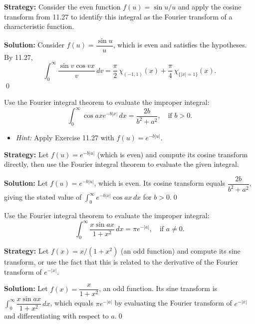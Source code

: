 \noindent\textbf{Strategy:} Consider the even function $f(u)=\sin u/u$ and apply the cosine transform from 11.27 to identify this integral as the Fourier transform of a characteristic function.

\bigskip\noindent\textbf{Solution:}
Consider $f(u)=\dfrac{\sin u}{u}$, which is even and satisfies the hypotheses. By 11.27,
\[\int_0^{\infty}\frac{\sin v\cos vx}{v}\,dv=\frac{\pi}{2}\,\chi_{(-1,1)}(x)+\frac{\pi}{4}\,\chi_{\{|x|=1\}}(x).\]\qed


\begin{problembox}
\begin{problemstatement}
Use the Fourier integral theorem to evaluate the improper integral:
\[
\int_0^\infty \cos ax e^{-b|x|} \, dx = \frac{2b}{b^2 + a^2}, \quad \text{if } b > 0.
\]
\begin{itemize}
\item \textit{Hint:} Apply Exercise 11.27 with $f(u) = e^{-b|u|}$.
\end{itemize}
\end{problemstatement}
\end{problembox}

\noindent\textbf{Strategy:} Let $f(u)=e^{-b|u|}$ (which is even) and compute its cosine transform directly, then use the Fourier integral theorem to evaluate the given integral.

\bigskip\noindent\textbf{Solution:}
Let $f(u)=e^{-b|u|}$, which is even. Its cosine transform equals $\dfrac{2b}{b^2+a^2}$, giving the stated value of $\int_0^{\infty}e^{-b|x|}\cos ax\,dx$ for $b>0$.\qed


\begin{problembox}
\begin{problemstatement}
Use the Fourier integral theorem to evaluate the improper integral:
\[
\int_0^\infty \frac{x \sin ax}{1 + x^2} \, dx = \pi e^{-|a|}, \quad \text{if } a \neq 0.
\]
\end{problemstatement}
\end{problembox}

\noindent\textbf{Strategy:} Let $f(x)=x/(1+x^2)$ (an odd function) and compute its sine transform, or use the fact that this is related to the derivative of the Fourier transform of $e^{-|x|}$.

\bigskip\noindent\textbf{Solution:}
Let $f(x)=\dfrac{x}{1+x^2}$, an odd function. Its sine transform is $\int_0^{\infty}\dfrac{x\sin ax}{1+x^2}\,dx$, which equals $\pi e^{-|a|}$ by evaluating the Fourier transform of $e^{-|x|}$ and differentiating with respect to $a$.\qed


